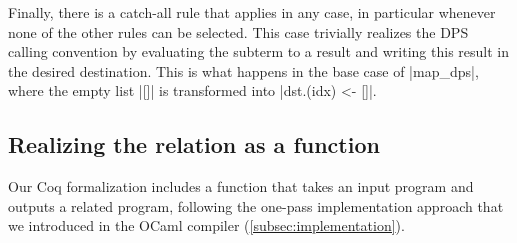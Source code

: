 Finally, there is a catch-all rule  that applies in any case, in particular whenever none of the other rules can be selected. This case trivially realizes the DPS calling convention by evaluating the subterm to a result and writing this result in the desired destination. This is what happens in the base case of \ocaml|map_dps|, where the empty list \ocaml|[]| is transformed into \ocaml|dst.(idx) <- []|.

% 


\subsection{Realizing the relation as a function}

Our Coq formalization includes a function that takes an input program and outputs a related program, following the one-pass implementation approach that we introduced in the OCaml compiler (\cref{subsec:implementation}).

